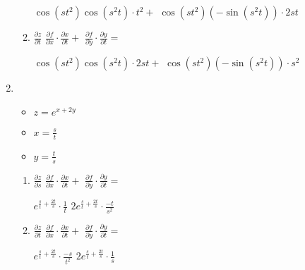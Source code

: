 \documentclass[../practica_04.tex]{subfiles}
\begin{document}
\begin{enumerate}
\begin{enumerate}
                    $ \cos(st^2)\cos(s^2t) \cdot t^2 + $
                    $ \cos(st^2)(-\sin(s^2t)) \cdot 2st $

                \item $\frac{\partial z}{\partial t}$
                    $ \frac{\partial f}{\partial x} \cdot \frac{\partial x}{\partial t} + $
                    $ \frac{\partial f}{\partial y} \cdot \frac{\partial y}{\partial t} = $

                    $ \cos(st^2)\cos(s^2t) \cdot 2st + $
                    $ \cos(st^2)(-\sin(s^2t)) \cdot s^2 $

            \end{enumerate}

        \item 
            \begin{itemize}
                \item $ z = e^{x+2y} $
                \item $ x = \frac{s}{t} $
                \item $ y = \frac{t}{s} $
            \end{itemize}

            \begin{enumerate}
                \item $\frac{\partial z}{\partial s}$
                    $ \frac{\partial f}{\partial x} \cdot \frac{\partial x}{\partial t} + $
                    $ \frac{\partial f}{\partial y} \cdot \frac{\partial y}{\partial t} = $

                    $ e^{\frac{s}{t}+\frac{2t}{s}} \cdot \frac{1}{t} $
                    $ 2e^{\frac{s}{t}+\frac{2t}{s}} \cdot \frac{-t}{s^2} $

                \item $\frac{\partial z}{\partial t}$
                    $ \frac{\partial f}{\partial x} \cdot \frac{\partial x}{\partial t} + $
                    $ \frac{\partial f}{\partial y} \cdot \frac{\partial y}{\partial t} = $

                    $ e^{\frac{s}{t}+\frac{2t}{s}} \cdot \frac{-s}{t^2} $
                    $ 2e^{\frac{s}{t}+\frac{2t}{s}} \cdot \frac{1}{s} $

            \end{enumerate}

    \end{enumerate}
\end{document}
